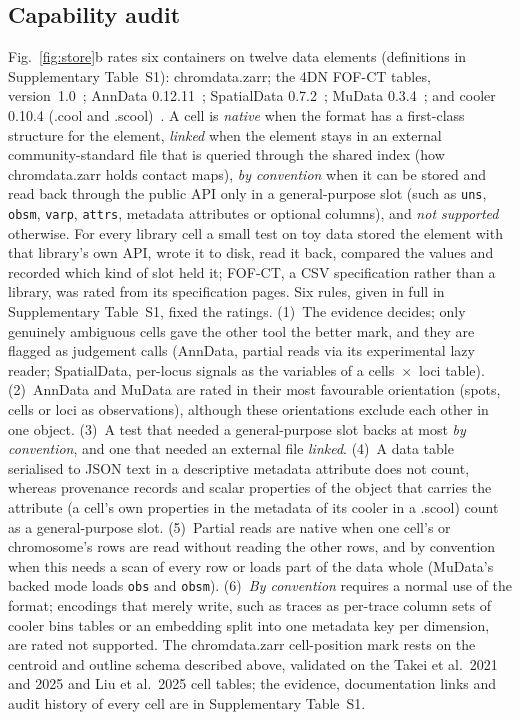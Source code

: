 \documentclass[11pt]{article}
\newcommand{\pkg}[1]{\texttt{#1}}
\begin{document}
\subsection*{Capability audit}
Fig.~\ref{fig:store}b rates six containers on twelve data elements (definitions in Supplementary Table~S1): chromdata.zarr; the 4DN FOF-CT tables, version~1.0~\citep{fofct}; AnnData 0.12.11~\citep{anndata}; SpatialData 0.7.2~\citep{spatialdata}; MuData 0.3.4~\citep{mudata}; and cooler 0.10.4 (.cool and .scool)~\citep{cooler}.
A cell is \emph{native} when the format has a first-class structure for the element, \emph{linked} when the element stays in an external community-standard file that is queried through the shared index (how chromdata.zarr holds contact maps), \emph{by convention} when it can be stored and read back through the public API only in a general-purpose slot (such as \pkg{uns}, \pkg{obsm}, \pkg{varp}, \pkg{attrs}, metadata attributes or optional columns), and \emph{not supported} otherwise.
For every library cell a small test on toy data stored the element with that library's own API, wrote it to disk, read it back, compared the values and recorded which kind of slot held it; FOF-CT, a CSV specification rather than a library, was rated from its specification pages.
Six rules, given in full in Supplementary Table~S1, fixed the ratings.
(1)~The evidence decides; only genuinely ambiguous cells gave the other tool the better mark, and they are flagged as judgement calls (AnnData, partial reads via its experimental lazy reader; SpatialData, per-locus signals as the variables of a cells~$\times$~loci table).
(2)~AnnData and MuData are rated in their most favourable orientation (spots, cells or loci as observations), although these orientations exclude each other in one object.
(3)~A test that needed a general-purpose slot backs at most \emph{by convention}, and one that needed an external file \emph{linked}.
(4)~A data table serialised to JSON text in a descriptive metadata attribute does not count, whereas provenance records and scalar properties of the object that carries the attribute (a cell's own properties in the metadata of its cooler in a .scool) count as a general-purpose slot.
(5)~Partial reads are native when one cell's or chromosome's rows are read without reading the other rows, and by convention when this needs a scan of every row or loads part of the data whole (MuData's backed mode loads \pkg{obs} and \pkg{obsm}).
(6)~\emph{By convention} requires a normal use of the format; encodings that merely write, such as traces as per-trace column sets of cooler bins tables or an embedding split into one metadata key per dimension, are rated not supported.
The chromdata.zarr cell-position mark rests on the centroid and outline schema described above, validated on the Takei et al.\ 2021 and 2025 and Liu et al.\ 2025 cell tables; the evidence, documentation links and audit history of every cell are in Supplementary Table~S1.
\end{document}
